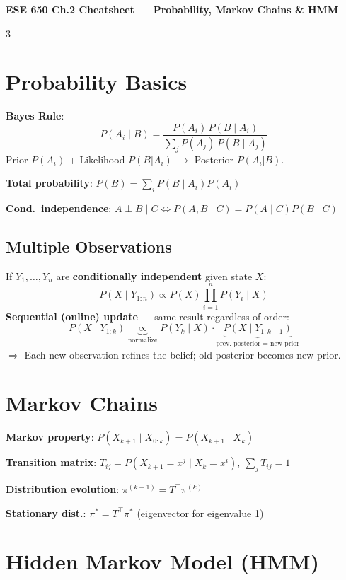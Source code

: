 \documentclass[9pt,landscape]{article}
\begin{document}
\begin{center}
  {\normalsize\bfseries ESE 650 Ch.2 Cheatsheet --- Probability, Markov Chains \& HMM}
\end{center}
\vspace{-4pt}
\begin{multicols}{3}

\section{Probability Basics}

\textbf{Bayes Rule}:
\[\boxed{P(A_i\mid B)=\frac{P(A_i)\,P(B\mid A_i)}{\sum_j P(A_j)\,P(B\mid A_j)}}\]
Prior $P(A_i)$ + Likelihood $P(B|A_i)$ $\to$ Posterior $P(A_i|B)$.

\textbf{Total probability}: $P(B)=\sum_i P(B\mid A_i)P(A_i)$

\textbf{Cond.\ independence}: $A\perp B\mid C \Leftrightarrow P(A,B\mid C)=P(A\mid C)P(B\mid C)$

\subsection{Multiple Observations}
If $Y_1,\ldots,Y_n$ are \textbf{conditionally independent} given state $X$:
\[P(X\mid Y_{1:n})\propto P(X)\prod_{i=1}^n P(Y_i\mid X)\]
\textbf{Sequential (online) update} --- same result regardless of order:
\[P(X\mid Y_{1:k})\underbrace{\propto}_{\text{normalize}} P(Y_k\mid X)\cdot \underbrace{P(X\mid Y_{1:k-1})}_{\text{prev.\ posterior = new prior}}\]
$\Rightarrow$ Each new observation refines the belief; old posterior becomes new prior.

\section{Markov Chains}

\textbf{Markov property}: $P(X_{k+1}\mid X_{0:k})=P(X_{k+1}\mid X_k)$

\textbf{Transition matrix}: $T_{ij}=P(X_{k+1}=x^j\mid X_k=x^i)$, $\sum_j T_{ij}=1$

\textbf{Distribution evolution}: $\pi^{(k+1)}=T^\top\pi^{(k)}$

\textbf{Stationary dist.}: $\pi^*=T^\top\pi^*$ (eigenvector for eigenvalue 1)

\section{Hidden Markov Model (HMM)}


\end{multicols}
\end{document}
